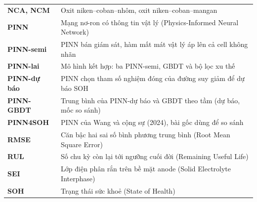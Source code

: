 {\begin{longtable}{@{}>{\bfseries}l >{\raggedright\arraybackslash}p{}@{}}
NCA, NCM & Oxit niken--coban--nhôm, oxit niken--coban--mangan\\
PINN & Mạng nơ-ron có thông tin vật lý (Physics-Informed Neural Network)\\
PINN-semi & PINN bán giám sát, hàm mất mát vật lý áp lên cả cell không nhãn\\
PINN-lai & Mô hình kết hợp: ba PINN-semi, GBDT và bộ lọc xu thế\\
PINN-dự báo & PINN chọn tham số nghiệm đóng của đường suy giảm để dự báo SOH\\
PINN-GBDT & Trung bình của PINN-dự báo và GBDT theo tầm (dự báo, mốc so sánh)\\
PINN4SOH & PINN của Wang và cộng sự (2024), bài gốc dùng để so sánh\\
RMSE & Căn bậc hai sai số bình phương trung bình (Root Mean Square Error)\\
RUL & Số chu kỳ còn lại tới ngưỡng cuối đời (Remaining Useful Life)\\
SEI & Lớp điện phân rắn trên bề mặt anode (Solid Electrolyte Interphase)\\
SOH & Trạng thái sức khoẻ (State of Health)\\
\bottomrule
\end{longtable}}
